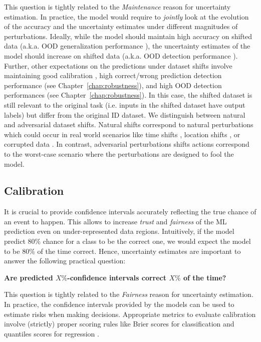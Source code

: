 This question is tightly related to the \emph{Maintenance} reason for uncertainty estimation. In practice, the model would require to \emph{jointly} look at the evolution of the accuracy and the uncertainty estimates under different magnitudes of perturbations. Ideally, while the model should maintain high accuracy on shifted data (a.k.a. OOD generalization performance \cite{ood-generalization-survey}), the uncertainty estimates of the model should increase on shifted data (a.k.a. OOD detection performance \cite{ood-detection-survey}). Further, other expectations on the predictions under dataset shifts involve maintaining good calibration \cite{dataset-shift}, high correct/wrong prediction detection performance (see Chapter~\ref{chap:robustness}), and high OOD detection performances (see Chapter~\ref{chap:robustness}). In this case, the shifted dataset is still relevant to the original task (i.e. inputs in the shifted dataset have output labels) but differ from the original ID dataset. We distinguish between natural and adversarial dataset shifts. Natural shifts correspond to natural perturbations which could occur in real world scenarios like time shifts \cite{wilds, neuhold201mapillary, shifts-dataset}, location shifts \cite{wilds, neuhold201mapillary, shifts-dataset}, or corrupted data \cite{benchmarking-corruptions, taori2020shift}. In contrast, adversarial perturbations shifts actions correspond to the worst-case scenario where the perturbations are designed to fool the model.

\subsection{Calibration}

It is crucial to provide confidence intervals accurately reflecting the true chance of an event to happen. This allows to increase \emph{trust} and \emph{fairness} of the ML prediction even on under-represented data regions. Intuitively, if the model predict $80\%$ chance for a class to be the correct one, we would expect the model to be $80\%$ of the time correct. Hence, uncertainty estimates are important to answer the following practical question:

\begin{center}
    \textbf{Are predicted $X\%$-confidence intervals correct $X\%$ of the time?}
\end{center}

This question is tightly related to the \emph{Fairness} reason for uncertainty estimation. In practice, the confidence intervals provided by the models can be used to estimate risks when making decisions. Appropriate metrics to evaluate calibration involve (strictly) proper scoring rules like Brier scores for classification and quantiles scores for regression \cite{scoring-rules}.